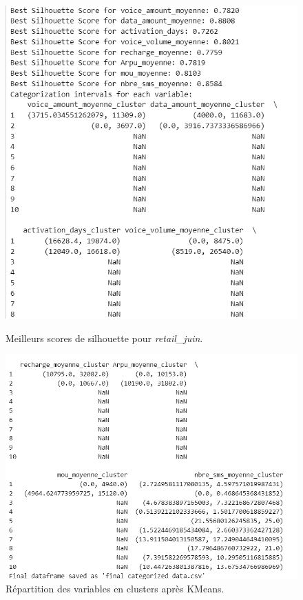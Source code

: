 \begin{figure}[H]
    \centering
    \begin{minipage}{0.45\linewidth}
        \centering
        \includegraphics[width=1\linewidth]{capture_modele_18.png}
        \caption{Meilleurs scores de silhouette pour \textit{retail\_juin}.}
        \label{fig:kmeans_intervals}
    \end{minipage}\hfill
    \begin{minipage}{0.45\linewidth}
        \centering
        \includegraphics[width=1\linewidth]{capture_modele_19.png}
        \caption{Répartition des variables en clusters après KMeans.}
        \label{kmeans_clusters}
    \end{minipage}
\end{figure}

